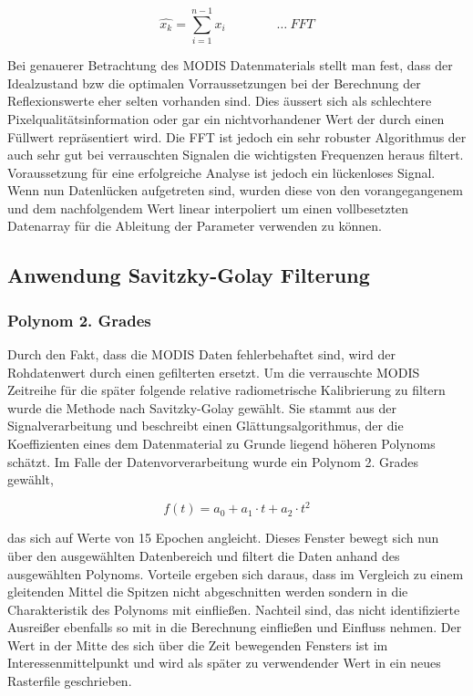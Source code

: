 \documentclass[11pt]{report}
\begin{document}
\begin{equation}
\hat{x_k}=\sum_{i=1}^{n-1} x_i \qquad\qquad \dots \ FFT
\end{equation}



Bei genauerer Betrachtung des MODIS Datenmaterials stellt man fest, dass der Idealzustand bzw die optimalen Vorraussetzungen bei der Berechnung der Reflexionswerte eher selten vorhanden sind. Dies äussert sich als schlechtere Pixelqualitätsinformation oder gar ein nichtvorhandener Wert der durch einen Füllwert repräsentiert wird. Die FFT ist jedoch ein sehr robuster Algorithmus der auch sehr gut bei verrauschten Signalen die wichtigsten Frequenzen heraus filtert. Voraussetzung für eine erfolgreiche Analyse ist jedoch ein lückenloses Signal. Wenn nun Datenlücken aufgetreten sind, wurden diese von den vorangegangenem und dem nachfolgendem Wert linear interpoliert um einen vollbesetzten Datenarray für die Ableitung der Parameter verwenden zu können. 


\subsection{Anwendung Savitzky-Golay Filterung}

\subsubsection{Polynom 2. Grades}
Durch den Fakt, dass die MODIS Daten fehlerbehaftet sind, wird der Rohdatenwert durch einen gefilterten ersetzt. Um die verrauschte MODIS Zeitreihe für die später folgende relative radiometrische Kalibrierung zu filtern wurde die Methode nach Savitzky-Golay gewählt. Sie stammt aus der Signalverarbeitung und beschreibt einen Glättungsalgorithmus, der die Koeffizienten eines dem Datenmaterial zu Grunde liegend höheren Polynoms schätzt. 
Im Falle der Datenvorverarbeitung wurde ein Polynom 2. Grades gewählt, 

\begin{equation}
\label{form_poly_2nd}
f(t) = a_0+a_1 \cdot t+a_2 \cdot t^2
\end{equation}

das sich auf Werte von 15 Epochen angleicht. Dieses Fenster bewegt sich nun über den ausgewählten Datenbereich und filtert die Daten anhand des ausgewählten Polynoms. Vorteile ergeben sich daraus, dass im Vergleich zu einem gleitenden Mittel die Spitzen nicht abgeschnitten werden sondern in die Charakteristik des Polynoms mit einfließen. Nachteil sind, das nicht identifizierte Ausreißer ebenfalls so mit in die Berechnung einfließen und Einfluss nehmen. Der Wert in der Mitte des sich über die Zeit bewegenden Fensters ist im Interessenmittelpunkt und wird als später zu verwendender Wert in ein neues Rasterfile geschrieben.
\end{document}
